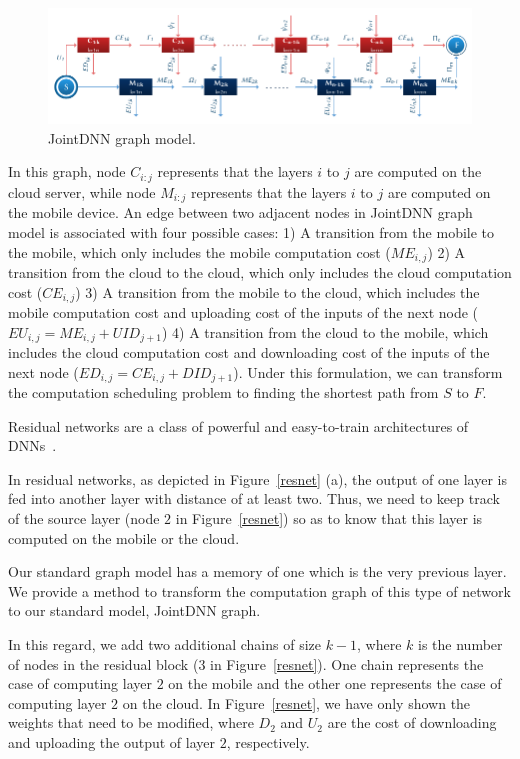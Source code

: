 \begin{figure}
\includegraphics{packing_topology}
\caption{JointDNN graph model.}
\label{packing_topology}
\end{figure}



In this graph, node $C_{i:j}$ represents that the layers $i$ to $j$ are computed on the cloud server, while node $M_{i:j}$ represents that the layers $i$ to $j$ are computed on the mobile device. An edge between two adjacent nodes in JointDNN graph model is associated with four possible cases: 1) A transition from the mobile to the mobile, which only includes the mobile computation cost ($ME_{i,j}$) 2) A transition from the cloud to the cloud, which only includes the cloud computation cost ($CE_{i,j}$) 3) A transition from the mobile to the cloud, which includes the mobile computation cost and uploading cost of the inputs of the next node ($EU_{i,j} = ME_{i,j} + UID_{j+1}$) 4) A transition from the cloud to the mobile, which includes the cloud computation cost and downloading cost of the inputs of the next node ($ED_{i,j} = CE_{i,j} + DID_{j+1}$). Under this formulation, we can transform the computation scheduling problem to finding the shortest path from $S$ to $F$. 

Residual networks are a class of powerful and easy-to-train architectures of DNNs~\cite{ResNet}. 


In residual networks, as depicted in Figure~\ref{resnet} (a), the output of one layer is fed into another layer with distance of at least two. Thus, we need to keep track of the source layer (node $2$ in Figure~\ref{resnet}) so as to know that this layer is computed on the mobile or the cloud. 

Our standard graph model has a memory of one which is the very previous layer. We provide a method to transform the computation graph of this type of network to our standard model, JointDNN graph. 

In this regard, we add two additional chains of size $k-1$, where $k$ is the number of nodes in the residual block ($3$ in Figure~\ref{resnet}). One chain represents the case of computing layer $2$ on the mobile and the other one represents the case of computing layer $2$ on the cloud. In Figure~\ref{resnet}, we have only shown the weights that need to be modified, where $D_2$ and $U_2$ are the cost of downloading and uploading the output of layer $2$, respectively.

